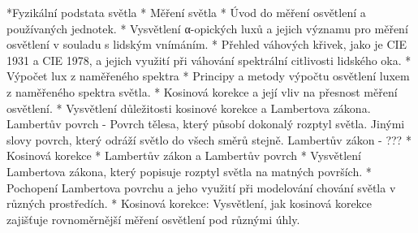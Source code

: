 \medskip
\begitems
    *Fyzikální podstata světla
    * Měření světla
    *     Úvod do měření osvětlení a používaných jednotek.
    *     Vysvětlení α-opických luxů a jejich významu pro měření osvětlení v souladu s lidským vnímáním.
    *     Přehled váhových křivek, jako je CIE 1931 a CIE 1978, a jejich využití při váhování spektrální citlivosti lidského oka.
    * Výpočet lux z naměřeného spektra
    *     Principy a metody výpočtu osvětlení luxem z naměřeného spektra světla.
    *     Kosinová korekce a její vliv na přesnost měření osvětlení.
       * Vysvětlení důležitosti kosinové korekce a Lambertova zákona.
Lambertův povrch - Povrch tělesa, který působí dokonalý rozptyl světla. Jinými slovy povrch, který odráží světlo do všech směrů stejně.
Lambertův zákon - ???
    * Kosinová korekce
    * Lambertův zákon a Lambertův povrch
    *     Vysvětlení Lambertova zákona, který popisuje rozptyl světla na matných površích.
    *     Pochopení Lambertova povrchu a jeho využití při modelování chování světla v různých prostředích.
    *     Kosinová korekce: Vysvětlení, jak kosinová korekce zajišťuje rovnoměrnější měření osvětlení pod různými úhly.
\enditems

